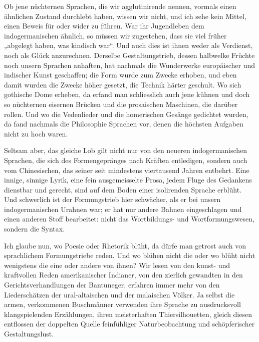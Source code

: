 Ob jene nüchternen Sprachen, die wir agglutinirende nennen, vormals einen ähnlichen Zustand durchlebt haben, wissen wir nicht, und ich sehe kein Mittel, einen Beweis für oder wider zu führen. War ihr Jugendleben dem indogermanischen ähnlich, so müssen wir zugestehen, dass sie viel früher „abgelegt haben, was kindisch war“. Und auch dies ist ihnen weder als Verdienst, noch als Glück anzurechnen. Derselbe Gestaltungstrieb, dessen halbwelke Früchte noch unsern Sprachen anhaften, hat nachmals die Wunderwerke europäischer und indischer Kunst geschaffen; die Form wurde zum Zwecke erhoben, und eben damit wurden die Zwecke höher gesetzt, die Technik härter geschult. Wo sich gothische Dome erheben, da erfand man schliesslich auch jene küh\label{fp.345}nen und doch so nüchternen eisernen Brücken und die prosaischen Maschinen, die darüber rollen. Und wo die Vedenlieder und die homerischen Gesänge gedichtet wurden, da fand nachmals die Philosophie Sprachen vor, denen die höchsten Aufgaben nicht zu hoch waren.

Seltsam aber, das gleiche Lob gilt nicht nur von den  neueren indogermanischen Sprachen, die sich des Formengepränges nach Kräften entledigen, sondern auch vom Chinesischen, das seiner seit mindestens viertausend Jahren entbehrt. Eine innige, sinnige Lyrik, eine  fein ausgemeisselte Prosa, jedem Fluge des Gedankens dienstbar und gerecht, sind auf dem Boden einer isolirenden Sprache erblüht. Und schwerlich ist der Formungstrieb hier schwächer, als er bei unsern indogermanischen Urahnen war; er hat nur andere Bahnen eingeschlagen und einen anderen Stoff bearbeitet: nicht das Wortbildungs- und Wortformungswesen, sondern die Syntax.

Ich glaube nun, wo Poesie oder Rhetorik blüht, da dürfe man getrost auch von sprachlichem Formungstriebe reden. Und wo blühen nicht die  oder wo blüht nicht wenigstens die eine oder andere von ihnen? Wir lesen von den kunst- und kraftvollen Reden amerikanischer Indianer, von den zierlich gewandten  in den Gerichtsverhandlungen der Bantu\label{fp.214}neger, erfahren immer mehr von den Liederschätzen der ural-altaischen und der malaischen Völker. Ja selbst die armen, verkommenen Buschmänner verwenden ihre  Sprache zu ausdrucksvoll klangspielenden Erzählungen,   ihren meisterhaften Thiersilhouetten, gleich diesen entflossen der doppelten Quelle feinfühliger Naturbeobachtung und schöpferischer Gestaltungslust.

